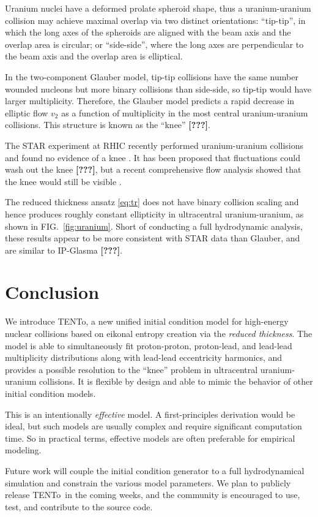 \documentclass[aps,prl,reprint,amsmath,nofootinbib]{revtex4-1}
\newcommand{\trento}{T\raisebox{-.5ex}{R}ENTo}
\newcommand{\needcite}{\textbf{[???]}}
\begin{document}
Uranium nuclei have a deformed prolate spheroid shape, thus a uranium-uranium collision may achieve maximal
overlap via two distinct orientations:  ``tip-tip'', in which the long axes of the spheroids are aligned with
the beam axis and the overlap area is circular; or ``side-side'', where the long axes are perpendicular to the
beam axis and the overlap area is elliptical.

In the two-component Glauber model, tip-tip collisions have the same number wounded nucleons but more binary
collisions than side-side, so tip-tip would have larger multiplicity.  Therefore, the Glauber model predicts a
rapid decrease in elliptic flow $v_2$ as a function of multiplicity in the most central uranium-uranium
collisions.  This structure is known as the ``knee'' \needcite.

The STAR experiment at RHIC recently performed uranium-uranium collisions and found no evidence of a knee
\cite{UU-STAR}.  It has been proposed that fluctuations could wash out the knee \needcite, but a recent
comprehensive flow analysis showed that the knee would still be visible \cite{osu}.

The reduced thickness ansatz \eqref{eq:tr} does not have binary collision scaling and hence produces roughly
constant ellipticity in ultracentral uranium-uranium, as shown in FIG.~\ref{fig:uranium}.  Short of conducting
a full hydrodynamic analysis, these results appear to be more consistent with STAR data than Glauber, and are
similar to IP-Glasma \needcite.


\section{Conclusion}

We introduce \trento, a new unified initial condition model for high-energy nuclear collisions based on
eikonal entropy creation via the \emph{reduced thickness}.  The model is able to simultaneously fit
proton-proton, proton-lead, and lead-lead multiplicity distributions along with lead-lead eccentricity harmonics,
and provides a possible resolution to the ``knee'' problem in ultracentral uranium-uranium collisions.
It is flexible by design and able to mimic the behavior of other initial condition models.

This is an intentionally \emph{effective} model.  A first-principles derivation would be ideal, but such
models are usually complex and require significant computation time.  So in practical terms, effective models
are often preferable for empirical modeling.

Future work will couple the initial condition generator to a full hydrodynamical simulation and constrain the
various model parameters.  We plan to publicly release \trento\ in the coming weeks, and the community is
encouraged to use, test, and contribute to the source code.




\end{document}
